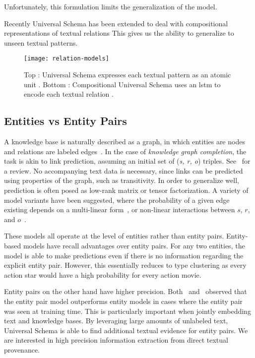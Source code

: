 Unfortunately, this formulation limits the generalization of the model.

Recently Universal Schema has been extended to deal with compositional representations of textual relations \citep{toutanova2015representing,verga2015multilingual}
This gives us the ability to generalize to unseen textual patterns.

\begin{figure}[h]
\caption{Top : Universal Schema expresses each textual pattern as an atomic unit \protect\citet{riedel2010modeling}.
Bottom : Compositional Universal Schema uses an lstm to encode each textual relation \protect\cite{verga2015multilingual}. }
\centering
\texttt{[image: relation-models]}
\end{figure}


\subsection {Entities vs Entity Pairs}

A knowledge base is naturally described as a graph, in which entities are nodes and relations are labeled edges~\citep{yago,freebase}.
In the case of \emph{knowledge graph completion}, the task is akin to link prediction, assuming an initial set of (\emph{s, r, o}) triples.
See~\citet{nickel2015review} for a review.
No accompanying text data is necessary, since links can be predicted using properties of the graph, such as transitivity.
In order to generalize well, prediction is often posed as low-rank matrix or tensor factorization.
A variety of model variants have been suggested, where the probability of a given edge existing depends on a multi-linear form~\citep{rescal,DBLP:journals/corr/Garcia-DuranBUG15,bishan,transe,wang2014knowledge,lin2015learning}, or non-linear interactions between $s$, $r$, and $o$~\citep{socherkb}.

These models all operate at the level of entities rather than entity pairs.
Entity-based models have recall advantages over entity pairs.
For any two entities, the model is able to make predictions even if there is no information regarding the explicit entity pair.
However, this essentially reduces to type clustering as every action star would have a high probability for every action movie.

Entity pairs on the other hand have higher precision.
Both~\citet{toutanova2015representing} and~\citet{limin} observed that the entity pair model outperforms entity models in cases where the entity pair was seen at training time.
This is particularly important when jointly embedding text and knowledge bases.
By leveraging large amounts of unlabeled text, Universal Schema is able to find additional textual evidence for entity pairs.
We are interested in high precision information extraction from direct textual provenance.


